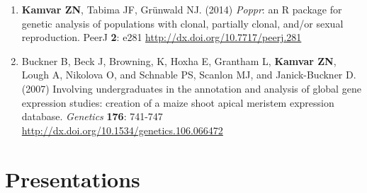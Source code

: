 \documentclass[11pt,letterpaper,sans]{moderncv} %
\begin{document}
\begin{enumerate}[leftmargin = 14pt]

    \item \textbf{Kamvar ZN}, Tabima JF, Gr\"unwald NJ. (2014) \textit{Poppr}: an
	R package for genetic analysis of populations with clonal, partially clonal,
	and/or sexual reproduction. PeerJ \textbf{2}: e281
	\url{http://dx.doi.org/10.7717/peerj.281}
	
	\vspace{6pt}

	\item Buckner B, Beck J, Browning, K, Hoxha E, Grantham L, \textbf{Kamvar ZN}, Lough A,
	Nikolova O, and Schnable PS, Scanlon MJ, and Janick-Buckner D. (2007) Involving
	undergraduates in the annotation and analysis of global gene expression studies:
	creation of a maize shoot apical meristem expression database. \textit{Genetics}
	\textbf{176}: 741-747 \url{http://dx.doi.org/10.1534/genetics.106.066472}

\end{enumerate}



\section{Presentations}
\end{document}
